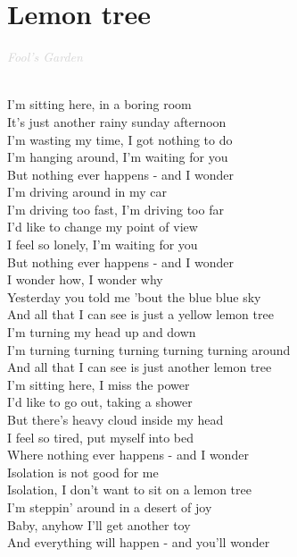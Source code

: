 \documentclass[a5paper, 10pt]{book}
\begin{document}
\section{Lemon tree}\textcolor{lightgray}{\textit{Fool's Garden}}\\~\\
\begin{minipage}[t]{0.8\textwidth}
I'm sitting here, in a boring room \\
It's just another rainy sunday afternoon\\
I'm wasting my time, I got nothing to do\\
I'm hanging around, I'm waiting for you\\
But nothing ever happens - and I wonder\\

I'm driving around in my car\\
I'm driving too fast, I'm driving too far\\
I'd like to change my point of view\\
I feel so lonely, I'm waiting for you\\
But nothing ever happens - and I wonder\\

\hspace*{5mm}I wonder how, I wonder why\\
\hspace*{5mm}Yesterday you told me 'bout the blue blue sky \\
\hspace*{5mm}And all that I can see is just a yellow lemon tree\\

\hspace*{5mm}I'm turning my head up and down\\
\hspace*{5mm}I'm turning turning turning turning turning around\\
\hspace*{5mm}And all that I can see is just another lemon tree\\

I'm sitting here, I miss the power \\
I'd like to go out, taking a shower\\
But there's heavy cloud inside my head\\
I feel so tired, put myself into bed\\
Where nothing ever happens - and I wonder \\

\hspace*{3mm}Isolation is not good for me\\
\hspace*{3mm}Isolation, I don't want to sit on a lemon tree \\

I'm steppin' around in a desert of joy\\
Baby, anyhow I'll get another toy\\
And everything will happen - and you'll wonder\\

\end{minipage}
\end{document}
